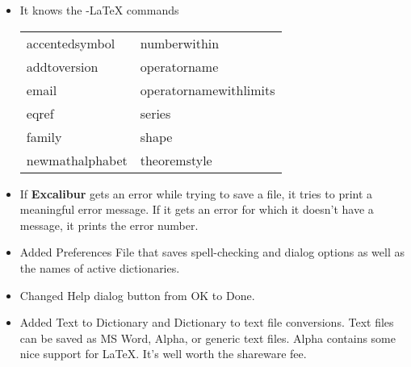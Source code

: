 \documentclass[11pt,titlepage]{article}
\newcommand{\ex}{\textbf{Excalibur}}
\newcommand{\AmS}{\latex{{\protect\the\textfont2
        A\kern-.1667em\lower.5ex\hbox{M}\kern-.125emS}}\html{AMS}}
\begin{document}
\begin{itemize}
\item It knows the \AmS-\LaTeX{} commands


  \begin{latexonly}
    \begin{tt}
      \begin{tabular}{ll}
        accentedsymbol  & numberwithin            \\
        addtoversion    & operatorname            \\
        email           & operatornamewithlimits  \\
        eqref           & series                  \\
        family          & shape                   \\
        newmathalphabet & theoremstyle
      \end{tabular}
    \end{tt}
  \end{latexonly}

\item If \ex{} gets an error while trying to save a file, it tries to
  print a meaningful error message. If it gets an error for which it
  doesn't have a message, it prints the error number.

\item Added Preferences File that saves spell-checking and dialog
  options as well as the names of active dictionaries.

\item Changed Help dialog button from OK to Done.

\item Added Text to Dictionary and Dictionary to text file
  conversions. Text files can be saved as MS Word, Alpha, or generic
  text files.  Alpha contains some nice support for \LaTeX.  It's well
  worth the shareware fee.
\end{itemize}
\end{document}
